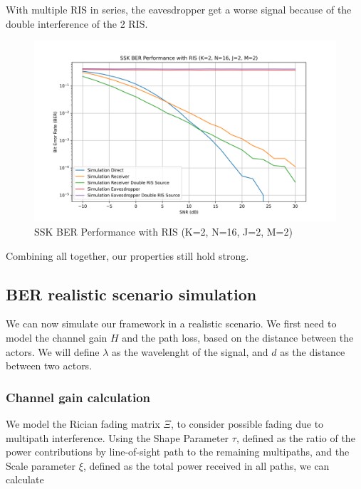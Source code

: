 With multiple RIS in series, the eavesdropper get a worse signal because of the double interference of the 2 RIS.

\begin{figure}[H]
  \centering
  \includegraphics[width=\linewidth]{imgs/ber-simulations/SSK BER Performance with RIS (K=2, N=16, J=2, M=2).png}
  \caption{SSK BER Performance with RIS (K=2, N=16, J=2, M=2)}
  \label{fig:simulation_j2_m2}
\end{figure}

Combining all together, our properties still hold strong.

\newpage
\subsection{BER realistic scenario simulation}

We can now simulate our framework in a realistic scenario. We first need to model the channel gain $H$ and the path loss, based on the distance between the actors. We will define $\lambda$ as the wavelenght of the signal, and $d$ as the distance between two actors.

\subsubsection{Channel gain calculation}

We model the Rician fading \cite{Rician_fading} matrix $\Xi$, to consider possible fading due to multipath interference. Using the Shape Parameter $\tau$, defined as the ratio of the power contributions by line-of-sight path to the remaining multipaths, and the Scale parameter $\xi$, defined as the total power received in all paths, we can calculate

